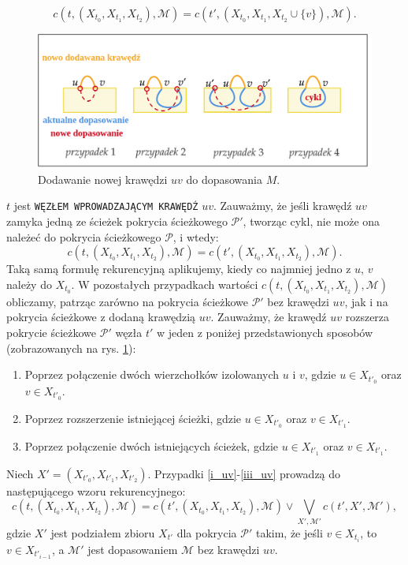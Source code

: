 \documentclass[12pt, oneside]{report}
\begin{document}
$$c(t, (X_{t_0}, X_{t_1}, X_{t_2}), \mathcal{M}) = c(t', (X_{t_0}, X_{t_1}, X_{t_2} \cup \{v\}), \mathcal{M}).$$
\begin{figure}
\centering
\includegraphics[width=16cm]{introduce_edge.png}
\caption{Dodawanie nowej krawędzi $uv$ do dopasowania $M$.}
\label{introduce_edge}
\end{figure}
$t$ jest \texttt{WĘZŁEM WPROWADZAJĄCYM KRAWĘDŹ} $uv$. Zauważmy, że jeśli krawędź $uv$ zamyka jedną ze ścieżek pokrycia ścieżkowego $\mathcal{P}'$, tworząc cykl, nie może ona należeć do pokrycia ścieżkowego $\mathcal{P}$, i wtedy:
$$c(t, (X_{t_0}, X_{t_1}, X_{t_2}), \mathcal{M}) = c(t', (X_{t_0}, X_{t_1}, X_{t_2}), \mathcal{M}).$$
Taką samą formułę rekurencyjną aplikujemy, kiedy co najmniej jedno z $u$, $v$ należy do $X_{t_0}$.  W pozostałych przypadkach wartości $c(t, (X_{t_0}, X_{t_1}, X_{t_2}), \mathcal{M})$ obliczamy, patrząc zarówno na pokrycia ścieżkowe $\mathcal{P}'$ bez krawędzi $uv$, jak i na pokrycia ścieżkowe z dodaną krawędzią $uv$. Zauważmy, że krawędź $uv$ rozszerza pokrycie ścieżkowe $\mathcal{P}'$ węzła $t'$ w jeden z poniżej przedstawionych sposobów (zobrazowanych na rys. \ref{introduce_edge}):
\begin{enumerate}
\item \label{i_uv}Poprzez połączenie dwóch wierzchołków izolowanych $u$ i $v$, gdzie $u \in X_{t'_0}$ oraz $v \in X_{t'_0}$.
\item Poprzez rozszerzenie istniejącej ścieżki, gdzie $u \in X_{t'_0}$ oraz $v \in X_{t'_1}$.
\item \label{iii_uv}Poprzez połączenie dwóch istniejących ścieżek, gdzie $u \in X_{t'_1}$ oraz $v \in X_{t'_1}$.
\end{enumerate}
Niech $X' = (X_{t'_0}, X_{t'_1}, X_{t'_2})$. Przypadki \ref{i_uv}-\ref{iii_uv} prowadzą do następującego wzoru rekurencyjnego:
$$c(t, (X_{t_0}, X_{t_1}, X_{t_2}), \mathcal{M}) =  c(t', (X_{t_0}, X_{t_1}, X_{t_2}), \mathcal{M}) \vee \bigvee \limits_{X', \mathcal{M'}} c(t', X', \mathcal{M}'),$$ gdzie $X'$ jest podziałem zbioru $X_{t'}$ dla pokrycia $\mathcal{P}'$ takim, że jeśli $v \in X_{t_i}$, to $v \in X_{t'_{i-1}}$, a $\mathcal{M}'$ jest dopasowaniem $\mathcal{M}$ bez krawędzi $uv$.
\end{document}
